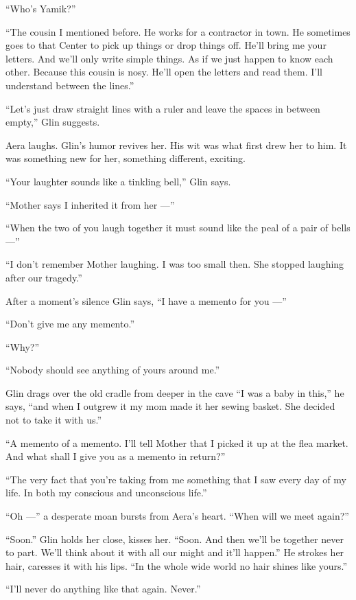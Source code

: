 \documentclass[twoside,11pt,openany]{book}
\begin{document}
``Who's Yamik?''

``The cousin I mentioned before. He works for a contractor in town. He sometimes goes to that Center to
pick up things or drop things off.  He'll bring me your letters. And we'll only write simple things. As if we just
happen to know each other. Because this cousin is nosy. He'll open the letters and read them. I'll understand between
the lines.''

``Let's just draw straight lines with a ruler and leave the spaces in between empty,'' Glin
suggests.

Aera laughs.  Glin's humor revives her. His wit was what first drew her to him. It was something new for her, something
different, exciting.

``Your laughter sounds like a tinkling bell,'' Glin says.

``Mother says I inherited it from her ---''

``When the two of you laugh together it must sound like the peal of a pair of bells ---''

``I don't remember Mother laughing. I was too small then. She stopped laughing after our
tragedy.''

After a moment's silence Glin says, ``I have a memento for you ---''

``Don't give me any memento.''

``Why?''

``Nobody should see anything of yours around me.''

Glin drags over the old cradle from deeper in the cave ``I was a baby in this,'' he says,
``and when I outgrew it my mom made it her sewing basket. She decided not to take it with
us.''

``A memento of a memento. I'll tell Mother that I picked it up at the flea market. And what shall I give
you as a memento in return?''

``The very fact that you're taking from me something that I saw every day of my life. In both my conscious
and unconscious life.''

``Oh ---'' a desperate moan bursts from Aera's heart. ``When will we meet
again?''

``Soon.'' Glin holds her close, kisses her. ``Soon. And then we'll be together
never to part. We'll think about it with all our might and it'll happen.'' He strokes her hair, caresses
it with his lips. ``In the whole wide world no hair shines like yours.''

``I'll never do anything like that again. Never.''
\end{document}
